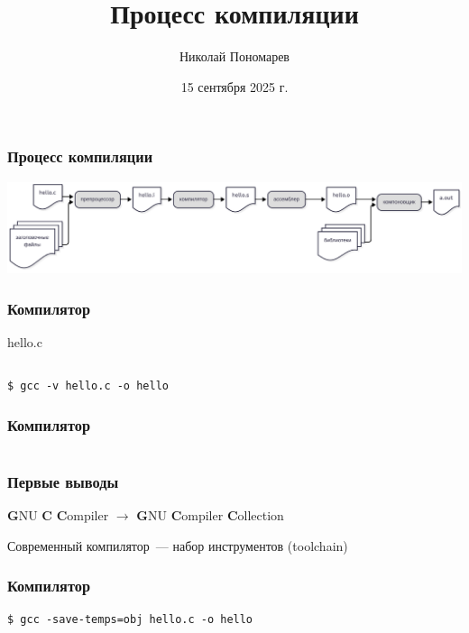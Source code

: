 \documentclass[aspectratio=169]{beamer}
\title{Процесс компиляции}
\author{Николай Пономарев}
\date{15 сентября 2025 г.}
\begin{document}
\begin{frame}
    \titlepage
\end{frame}

\begin{frame}
    \frametitle{Процесс компиляции}

    \begin{center}
        \includegraphics[width=1\linewidth]{comp_pipeline.pdf}
    \end{center}

\end{frame}

\begin{frame}[fragile]
    \frametitle{Компилятор}

    \begin{block}{hello.c}
        \inputminted{c}{workdir/hello.c}
    \end{block}

    \vspace{1em}

    \begin{verbatim}
$ gcc -v hello.c -o hello
    \end{verbatim}

\end{frame}

\begin{frame}
    \frametitle{Компилятор}

    \inputminted[breaklines]{console}{gcc_-v_hello.c_trace.txt}

\end{frame}

\begin{frame}
    \frametitle{Первые выводы}

    \textbf{G}NU \textbf{C} \textbf{C}ompiler $\rightarrow$ \textbf{G}NU \textbf{C}ompiler \textbf{C}ollection

    Современный компилятор~--- набор инструментов (toolchain)

\end{frame}

\begin{frame}[fragile]
    \frametitle{Компилятор}

    \begin{verbatim}
$ gcc -save-temps=obj hello.c -o hello
    \end{verbatim}

\end{frame}
\end{document}
